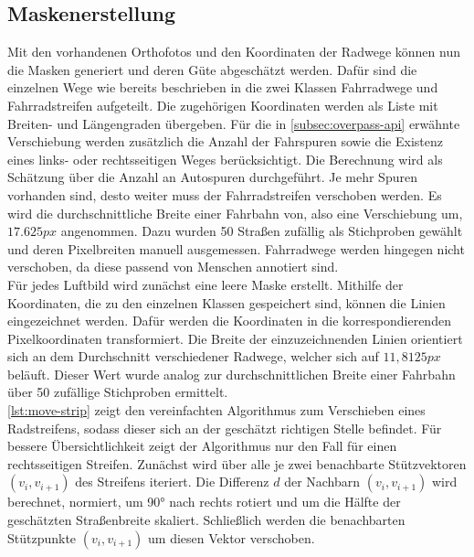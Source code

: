 \subsection{Maskenerstellung}

Mit den vorhandenen Orthofotos und den Koordinaten der Radwege können nun die Masken generiert 
und deren Güte abgeschätzt werden.
Dafür sind die einzelnen Wege wie bereits beschrieben in die zwei Klassen Fahrradwege und Fahrradstreifen aufgeteilt.
Die zugehörigen Koordinaten werden als Liste mit Breiten- und Längengraden übergeben.
Für die in \autoref{subsec:overpass-api} erwähnte Verschiebung werden zusätzlich die Anzahl der Fahrspuren sowie die Existenz eines links- oder rechtsseitigen Weges berücksichtigt.
Die Berechnung wird als Schätzung über die Anzahl an Autospuren durchgeführt.
Je mehr Spuren vorhanden sind, desto weiter muss der Fahrradstreifen verschoben werden.
Es wird die durchschnittliche Breite einer Fahrbahn von, also eine Verschiebung um, $17.625px$ angenommen. 
Dazu wurden 50 Straßen zufällig als Stichproben gewählt und deren Pixelbreiten manuell ausgemessen. 
Fahrradwege werden hingegen nicht verschoben, da diese passend von Menschen annotiert sind.\\
Für jedes Luftbild wird zunächst eine leere Maske erstellt.
Mithilfe der Koordinaten, die zu den einzelnen Klassen gespeichert sind, können die Linien eingezeichnet werden.
Dafür werden die Koordinaten in die korrespondierenden Pixelkoordinaten transformiert.
Die Breite der einzuzeichnenden Linien orientiert sich an dem Durchschnitt verschiedener Radwege, welcher sich auf $11,8125px$ beläuft.
Dieser Wert wurde analog zur durchschnittlichen Breite einer Fahrbahn über 50 zufällige Stichproben ermittelt. \\
\autoref{lst:move-strip} zeigt den vereinfachten Algorithmus zum Verschieben eines Radstreifens,
sodass dieser sich an der geschätzt richtigen Stelle befindet. Für bessere Übersichtlichkeit 
zeigt der Algorithmus nur den Fall für einen rechtsseitigen Streifen. 
Zunächst wird über alle je zwei benachbarte Stützvektoren $(v_i,v_{i+1})$ des Streifens iteriert. Die Differenz $d$ der Nachbarn $(v_i,v_{i+1})$ 
wird berechnet, normiert, um 90° nach rechts rotiert und um die Hälfte der geschätzten Straßenbreite skaliert. 
Schließlich werden die benachbarten Stützpunkte $(v_i,v_{i+1})$ um diesen Vektor verschoben. 

